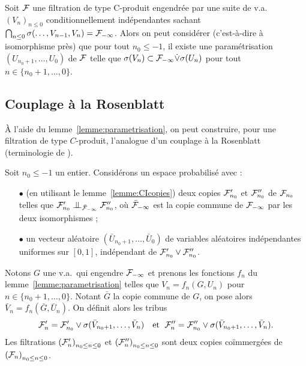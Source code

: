 \documentclass[12pt,a4paper]{article}
\begin{document}
\begin{lemme}\label{lemme:parametrisation}
Soit $\mathcal{F}$ une filtration de type C-produit engendrée par 
une suite de v.a.\ ${(V_n)}_{n \leq 0}$  conditionnellement indépendantes 
sachant $\bigcap_{n \leq 0}\sigma(\ldots, V_{n-1}, V_n) = \mathcal{F}_{-\infty}$. 
Alors on peut considérer (c'est-à-dire à isomorphisme près) que 
pour tout $n_0 \leq -1$, il existe une paramétrisation 
$(U_{n_0+1}, \ldots, U_0)$  de $\mathcal{F}$ 
telle que $\sigma(V_n) \subset \mathcal{F}_{-\infty} \dot{\vee} \sigma(U_n)$ 
pour tout  $n \in \{n_0+1, \ldots, 0\}$.
\end{lemme}



\subsection{Couplage à la Rosenblatt}\label{sec:Rosenblatt}

\`A l'aide du lemme~\ref{lemme:parametrisation}, on 
peut construire, pour une filtration de type 
$C$-produit, l'analogue d'un couplage à la Rosenblatt (terminologie de \cite{LauXLIII}).


Soit $n_0 \leq -1$ un entier. 
Considérons un espace probabilisé avec : 
\begin{itemize}
\item[$\bullet$] (en utilisant le lemme~\ref{lemme:CIcopies}) 
deux copies $\mathcal{F}'_{n_0}$ et $\mathcal{F}''_{n_0}$ de $\mathcal{F}_{n_0}$
 telles que $\FF'_{n_0} \indep_{\bar\FF_{-\infty}} \FF''_{n_0}$, 
 où $\bar{\mathcal{F}}_{-\infty}$ est la copie commune de $\mathcal{F}_{-\infty}$ par les deux 
isomorphismes ;

\item[$\bullet$] un vecteur aléatoire $(\bar U_{n_0+1}, \ldots, \bar U_0)$ 
de variables aléatoires indépendantes uniformes sur $[0,1]$, indépendant 
de $\mathcal{F}'_{n_0} \vee \mathcal{F}''_{n_0}$. 
\end{itemize}

Notons $G$ une v.a.\ qui engendre  $\mathcal{F}_{-\infty}$ et prenons les fonctions $f_n$ du lemme~\ref{lemme:parametrisation} telles que $V_n = f_n(G, U_n)$ 
pour $n \in \{n_0+1, \ldots, 0\}$. 
Notant $\bar G$ la copie commune de $G$, on pose alors 
$\bar V_n = f_n(\bar G, \bar U_n)$. 
On définit alors les tribus 
$$
\mathcal{F}'_n = \mathcal{F}'_{n_0} \vee \sigma(\bar V_{n_0+1}, \ldots, \bar V_n) 
\quad \text{et }\;
\mathcal{F}''_n = \mathcal{F}''_{n_0} \vee \sigma(\bar V_{n_0+1}, \ldots, \bar V_n).  
$$
Les filtrations ${(\mathcal{F}'_n)}_{n_0 \leq n \leq 0}$ et 
${(\mathcal{F}''_n)}_{n_0 \leq n \leq 0}$ sont deux copies co\"immergées de 
${(\mathcal{F}_n)}_{n_0 \leq n \leq 0}$. 
\end{document}
